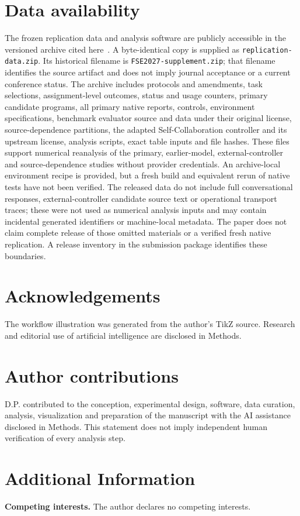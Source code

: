 \documentclass[pdflatex,sn-nature]{scientificreports}
\begin{document}
\section*{Data availability}
The frozen replication data and analysis software are publicly accessible in the versioned archive cited here~\cite{privezentsev2026data}. A byte-identical copy is supplied as \texttt{replication-data.zip}. Its historical filename is \texttt{FSE2027-supplement.zip}; that filename identifies the source artifact and does not imply journal acceptance or a current conference status. The archive includes protocols and amendments, task selections, assignment-level outcomes, status and usage counters, primary candidate programs, all primary native reports, controls, environment specifications, benchmark evaluator source and data under their original license, source-dependence partitions, the adapted Self-Collaboration controller and its upstream license, analysis scripts, exact table inputs and file hashes. These files support numerical reanalysis of the primary, earlier-model, external-controller and source-dependence studies without provider credentials. An archive-local environment recipe is provided, but a fresh build and equivalent rerun of native tests have not been verified. The released data do not include full conversational responses, external-controller candidate source text or operational transport traces; these were not used as numerical analysis inputs and may contain incidental generated identifiers or machine-local metadata. The paper does not claim complete release of those omitted materials or a verified fresh native replication. A release inventory in the submission package identifies these boundaries.

\section*{Acknowledgements}
The workflow illustration was generated from the author's TikZ source. Research and editorial use of artificial intelligence are disclosed in Methods.
\section*{Author contributions}
D.P. contributed to the conception, experimental design, software, data curation, analysis, visualization and preparation of the manuscript with the AI assistance disclosed in Methods. This statement does not imply independent human verification of every analysis step.
\section*{Additional Information}
\textbf{Competing interests.} The author declares no competing interests.
\end{document}
